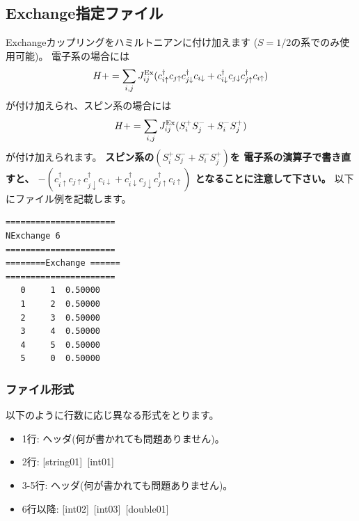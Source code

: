 \subsection{Exchange指定ファイル}
Exchangeカップリングをハミルトニアンに付け加えます{ ($S=1/2$の系でのみ使用可能)}。
電子系の場合には
\begin{equation}
H+=\sum_{i,j}J_{ij}^{\rm Ex} (c_ {i \uparrow}^{\dag}c_{j\uparrow}c_{j \downarrow}^{\dag}c_{i  \downarrow}+c_ {i \downarrow}^{\dag}c_{j\downarrow}c_{j \uparrow}^{\dag}c_{i  \uparrow})
\end{equation}
が付け加えられ、スピン系の場合には
\begin{equation}
H+=\sum_{i,j}J_{ij}^{\rm Ex} (S_i^+S_j^-+S_i^-S_j^+)
\end{equation}
が付け加えられます。
{\bf スピン系の$(S_i^+S_j^-+S_i^-S_j^+)$を
電子系の演算子で書き直すと、
$-(c_ {i \uparrow}^{\dag}c_{j\uparrow}c_{j \downarrow}^{\dag}c_{i  \downarrow}+c_ {i \downarrow}^{\dag}c_{j\downarrow}c_{j \uparrow}^{\dag}c_{i  \uparrow})$
となることに注意して下さい。}
以下にファイル例を記載します。

\begin{minipage}{12.5cm}
\begin{screen}
\begin{verbatim}
====================== 
NExchange 6  
====================== 
========Exchange ====== 
====================== 
   0     1  0.50000
   1     2  0.50000
   2     3  0.50000
   3     4  0.50000
   4     5  0.50000
   5     0  0.50000
\end{verbatim}
\end{screen}
\end{minipage}

\subsubsection{ファイル形式}
以下のように行数に応じ異なる形式をとります。
 \begin{itemize}
   \item  1行:  ヘッダ(何が書かれても問題ありません)。
   \item  2行:   [string01]~[int01]
   \item  3-5行:  ヘッダ(何が書かれても問題ありません)。
   \item  6行以降:
   [int02]~[int03]~[double01] 
  \end{itemize}
